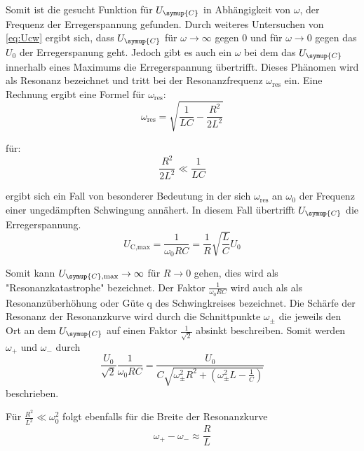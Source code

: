     \noindent Somit ist die gesucht Funktion für $U_{\symup{C}}$ in Abhängigkeit von $\omega$, der Frequenz der Erregerspannung gefunden. Durch 
    weiteres Untersuchen von \ref{eq:Ucw} ergibt sich, dass $U_{\symup{C}}$ für $\omega \to \infty $ gegen 0 und für $\omega \to 0$ gegen 
    das $U_0$ der Erregerspanung geht. Jedoch gibt es auch ein $\omega$ bei dem das $U_{\symup{C}}$ innerhalb eines Maximums die 
    Erregerspannung übertrifft. Dieses Phänomen wird als Resonanz bezeichnet und tritt bei der Resonanzfrequenz $\omega_{\text{res}}$ ein. 
    Eine Rechnung ergibt eine Formel für $\omega_{\text{res}}$:
    \begin{equation}
        \omega_{\text{res}} = \sqrt{\frac{1}{LC}-\frac{R^2}{2L^2}} \nonumber
    \end{equation}

    für: 
    \begin{equation}
        \frac{R^2}{2L^2} \ll \frac{1}{LC} \nonumber
    \end{equation}

    \noindent ergibt sich ein Fall von besonderer Bedeutung in der sich $\omega_{\text{res}}$ an $\omega_0$ der Frequenz einer ungedämpften 
    Schwingung annähert. In diesem Fall übertrifft $U_{\symup{C}}$ die Erregerspannung.
    \begin{equation}
        U_{\text{C,max}} = \frac{1}{\omega_0 RC} = \frac{1}{R} \sqrt{\frac{L}{C}} U_0 \nonumber
    \end{equation}

    \noindent Somit kann $U_{\symup{C},\text{max}} \to \infty$ für $R \to 0$ gehen, dies wird als "Resonanzkatastrophe" bezeichnet. Der Faktor
    $\frac{1}{\omega_0 RC}$ wird auch als als Resonanzüberhöhung oder Güte q des Schwingkreises bezeichnet. Die Schärfe der Resonanz 
    der Resonanzkurve wird durch die Schnittpunkte $\omega_{\pm}$ die jeweils den Ort an dem $U_{\symup{C}}$ auf einen Faktor $\frac{1}{\sqrt{2}}$ 
    absinkt beschreiben. Somit werden $\omega_+$ und $\omega_-$ durch 
    \begin{equation}
        \frac{U_0}{\sqrt{2}} \frac{1}{\omega_0 RC} = \frac{U_0}{C \sqrt{\omega^2_{\pm} R^2 + \left( \omega^2_{\pm}L - \frac{1}{C} \right) }} \nonumber
    \end{equation}
    beschrieben.

    \noindent Für $\frac{R^2}{L^2} \ll {\omega}^2_0$ folgt ebenfalls für die Breite der Resonanzkurve
    \begin{equation}
        \omega_+ - \omega_- \approx \frac{R}{L} 
        \label{eq:v1}
    \end{equation}

